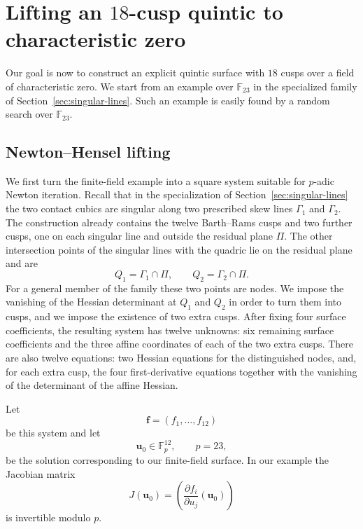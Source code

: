\documentclass[10pt,a4paper]{article}
\begin{document}
\section{Lifting an $18$-cusp quintic to characteristic zero}
\label{sec:lifting}

Our goal is now to construct an explicit quintic surface with $18$ cusps over
a field of characteristic zero.  We start from an example over
$\mathbb F_{23}$ in the specialized family of
Section~\ref{sec:singular-lines}.  Such an example is easily found by a random
search over $\mathbb F_{23}$.

\subsection{Newton--Hensel lifting}

We first turn the finite-field example into a square system suitable for
$p$-adic Newton iteration.  Recall that in the specialization of
Section~\ref{sec:singular-lines} the two contact cubics are singular along two
prescribed skew lines $\Gamma_1$ and $\Gamma_2$.  The construction already
contains the twelve Barth--Rams cusps and two further cusps, one on each
singular line and outside the residual plane $\Pi$.  The other intersection
points of the singular lines with the quadric lie on the residual plane and
are
\[
        Q_1=\Gamma_1\cap\Pi,\qquad
        Q_2=\Gamma_2\cap\Pi.
\]
For a general member of the family these two points are nodes.  We impose the
vanishing of the Hessian determinant at $Q_1$ and $Q_2$ in order to turn them
into cusps, and we impose the existence of two extra cusps.  After fixing four
surface coefficients, the resulting system has twelve unknowns: six remaining
surface coefficients and the three affine coordinates of each of the two
extra cusps.  There are also
twelve equations: two Hessian equations for the distinguished nodes, and, for
each extra cusp, the four first-derivative equations together with the
vanishing of the determinant of the affine Hessian.

Let
\[
        \boldsymbol f=(f_1,\ldots,f_{12})
\]
be this system and let
\[
        \boldsymbol u_0\in\mathbb F_p^{12},
        \qquad p=23,
\]
be the solution corresponding to our finite-field surface.  In our example
the Jacobian matrix
\[
        J(\boldsymbol u_0)
        =
        \left(
        \frac{\partial f_i}{\partial u_j}(\boldsymbol u_0)
        \right)
\]
is invertible modulo $p$.
\end{document}
